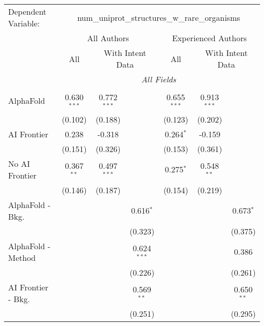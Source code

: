 \begingroup
\centering
\begin{tabular}{lcccccc}
   \tabularnewline \midrule \midrule
   Dependent Variable: & \multicolumn{6}{c}{num\_uniprot\_structures\_w\_rare\_organisms}\\
 & \multicolumn{3}{c}{All Authors} & \multicolumn{3}{c}{Experienced Authors} \\
\cmidrule(lr){2-4} \cmidrule(lr){5-7}
 & \multicolumn{1}{c}{All} & \multicolumn{2}{c}{With Intent Data} & \multicolumn{1}{c}{All} & \multicolumn{2}{c}{With Intent Data} \\
\cmidrule(lr){2-2} \cmidrule(lr){3-4} \cmidrule(lr){5-5} \cmidrule(lr){6-7}
 & \multicolumn{6}{c}{\textit{All Fields}} \\ \\
   AlphaFold               & 0.630$^{***}$ & 0.772$^{***}$ &               & 0.655$^{***}$ & 0.913$^{***}$ &   \\   
                           & (0.102)       & (0.188)       &               & (0.123)       & (0.202)       &   \\   
   AI Frontier             & 0.238         & -0.318        &               & 0.264$^{*}$   & -0.159        &   \\   
                           & (0.151)       & (0.326)       &               & (0.153)       & (0.361)       &   \\   
   No AI Frontier          & 0.367$^{**}$  & 0.497$^{***}$ &               & 0.275$^{*}$   & 0.548$^{**}$  &   \\   
                           & (0.146)       & (0.187)       &               & (0.154)       & (0.219)       &   \\   
   AlphaFold - Bkg.        &               &               & 0.616$^{*}$   &               &               & 0.673$^{*}$\\   
                           &               &               & (0.323)       &               &               & (0.375)\\   
   AlphaFold - Method      &               &               & 0.624$^{***}$ &               &               & 0.386\\   
                           &               &               & (0.226)       &               &               & (0.261)\\   
   AI Frontier - Bkg.      &               &               & 0.569$^{**}$  &               &               & 0.650$^{**}$\\   
                           &               &               & (0.251)       &               &               & (0.295)\\   

\end{tabular}
